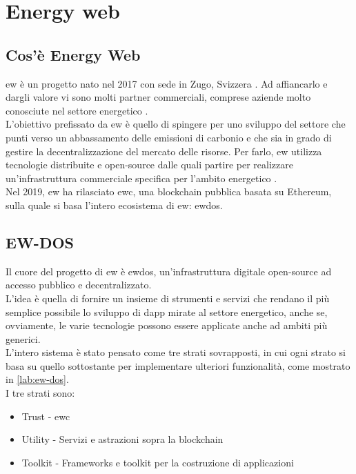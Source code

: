 \chapter{Energy web}

\section{Cos'è Energy Web}
\gls{ew} è un progetto nato nel 2017 con sede in Zugo, Svizzera \cite{wiki:ew-history}.
Ad affiancarlo e dargli valore vi sono molti partner commerciali, comprese aziende molto conosciute nel settore energetico \cite{wiki:ew-affiliate}. \\
L'obiettivo prefissato da \gls{ew} è quello di spingere per uno sviluppo del settore che punti verso un abbassamento delle emissioni di carbonio e che sia in grado di gestire la decentralizzazione del mercato delle risorse.
Per farlo, \gls{ew} utilizza tecnologie distribuite e open-source dalle quali partire per realizzare un'infrastruttura commerciale specifica per l'ambito energetico \cite{wiki:ew-about}. \\
Nel 2019, \gls{ew} ha rilasciato \gls{ewc}, una blockchain pubblica basata su Ethereum, sulla quale si basa l'intero ecosistema di \gls{ew}: \gls{ewdos}.

\section{EW-DOS}
Il cuore del progetto di \gls{ew} è \gls{ewdos}, un'infrastruttura digitale open-source ad accesso pubblico e decentralizzato. \\
L'idea è quella di fornire un insieme di strumenti e servizi che rendano il più semplice possibile lo sviluppo di \gls{dapp} mirate al settore energetico,
anche se, ovviamente, le varie tecnologie possono essere applicate anche ad ambiti più generici. \\
L'intero sistema è stato pensato come tre strati sovrapposti, in cui ogni strato si basa su quello sottostante per implementare ulteriori funzionalità, come mostrato in \autoref{lab:ew-dos}. \\

I tre strati sono:
\begin{itemize}
    \item Trust - \gls{ewc}
    \item Utility - Servizi e astrazioni sopra la blockchain
    \item Toolkit - Frameworks e toolkit per la costruzione di applicazioni
\end{itemize}

